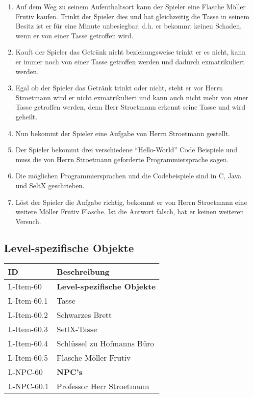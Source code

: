 \begin{enumerate}
\item Auf dem Weg zu seinem Aufenthaltsort kann der Spieler eine Flasche Möller Frutiv kaufen. Trinkt der Spieler dies und hat gleichzeitig die Tasse in seinem Besitz ist er  für eine Minute unbesiegbar, d.h. er bekommt keinen Schaden, wenn er von einer Tasse getroffen wird.
\item Kauft der Spieler das Getränk nicht beziehungsweise trinkt er es nicht, kann er immer noch von einer Tasse getroffen werden und dadurch exmatrikuliert werden.
\item Egal ob der Spieler das Getränk trinkt oder nicht, steht er vor Herrn Stroetmann wird er nicht exmatrikuliert und kann auch nicht mehr von einer Tasse getroffen werden, denn Herr Stroetmann erkennt seine Tasse und wird geheilt.
\item Nun bekommt der Spieler eine Aufgabe von Herrn Stroetmann gestellt.
\item Der Spieler bekommt drei verschiedene \enquote{Hello-World} Code Beispiele und muss die von Herrn Stroetmann geforderte Programmiersprache sagen.
\item Die möglichen Programmiersprachen und die Codebeispiele sind in C, Java und SeltX geschrieben.
\item Löst der Spieler die Aufgabe richtig, bekommt er von Herrn Stroetmann eine weitere Möller Frutiv Flasche. Ist die Antwort falsch, hat er keinen weiteren Versuch. 
\end{enumerate}
\subsection{Level-spezifische Objekte}
\begin{tabularx}{\textwidth}{|l|l|}
\toprule
\textbf{ID} & \textbf{Beschreibung}\\
\endhead
\hline
L-Item-60 & \textbf{Level-spezifische Objekte} \\
L-Item-60.1 & Tasse  \\
L-Item-60.2 & Schwarzes Brett  \\
L-Item-60.3 & SetlX-Tasse  \\
L-Item-60.4 & Schlüssel zu Hofmanns Büro  \\
L-Item-60.5 & Flasche Möller Frutiv  \\
\hline
L-NPC-60 & \textbf{NPC's} \\
L-NPC-60.1 & Professor Herr Stroetmann \\
\hline
\end{tabularx}

